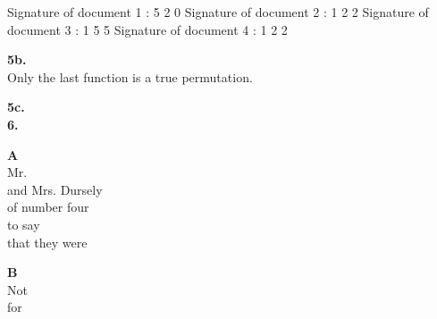\documentclass[10pt]{amsart}
\begin{document}
Signature of document 1 : 5 2 0
Signature of document 2 : 1 2 2
Signature of document 3 : 1 5 5
Signature of document 4 : 1 2 2

\textbf{5b.} \\

Only the last function is a true permutation.

\textbf{5c.} \\

\textbf{6.} \\

\begin{tabular}[l]
  \textbf{A} \\


  Mr. \\
  and Mrs. Dursely \\
  of number four\\
  to say \\
  that they were \\

\end{tabular}

\begin{tabular}[l]
  \textbf{B} \\


  Not \\
  for \\

\end{tabular}
\end{document}
